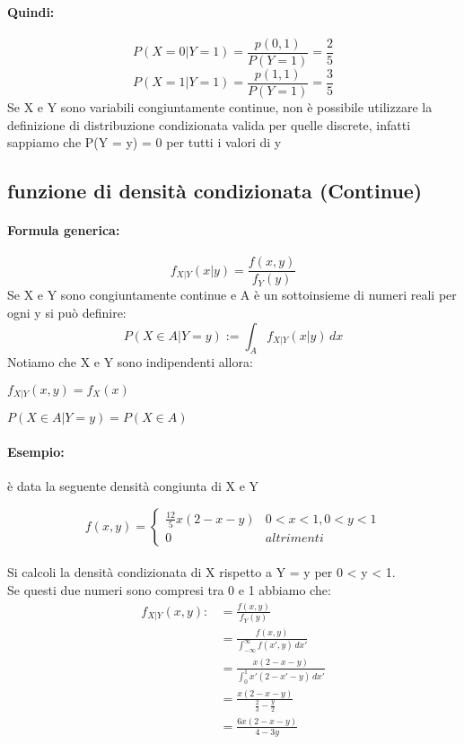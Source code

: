 \documentclass[]{article}
\newcommand{\formula}{\paragraph{Formula generica:}}
\begin{document}
    \paragraph{Quindi:}
    \[ P(X = 0 | Y = 1) = \frac{p(0,1)}{P(Y = 1)} = \frac{2}{5} \]
    \[ P(X = 1 | Y = 1) = \frac{p(1,1)}{P(Y = 1)} = \frac{3}{5} \]
    Se X e Y sono variabili congiuntamente continue, non è possibile utilizzare la
    definizione di distribuzione condizionata valida per quelle discrete, infatti sappiamo
    che P(Y = y) = 0 per tutti i valori di y


    \subsection{funzione di densità condizionata (Continue)}
    \formula
    \[ f_{X|Y}(x | y) = \frac{f(x, y)}{f_Y(y)}\]
    Se X e Y sono congiuntamente continue e A è un sottoinsieme di numeri reali per ogni y si può definire:
    \[ P(X \in A | Y = y) := \int_{A}^{} f_{X|Y}(x | y) \, dx \]
    Notiamo che X e Y sono indipendenti allora:
    \begin{center}
        \begin{minipage}{0.45 \textwidth}
            $ f_{X|Y}(x,y) = f_X(x) $
        \end{minipage}
        \begin{minipage}{0.45 \textwidth}
            $ P(X \in A | Y = y) = P(X \in A) $
        \end{minipage}
    \end{center}


    \paragraph{Esempio:} è data la seguente densità congiunta di X e Y



    \begin{equation*}
        f(x,y) =
        \begin{cases}
            \frac{12}{5} x(2-x-y) & 0 < x < 1, 0 < y < 1 \\
            0 & altrimenti
        \end{cases}
    \end{equation*} \\
    \linebreak[2]
    Si calcoli la densità condizionata di X rispetto a Y = y per 0 < y < 1. \\
    Se questi due numeri sono compresi tra 0 e 1 abbiamo che:
    \begin{equation*}
        \begin{split}
            f_{X|Y}(x,y):&= \frac{f(x,y)}{f_Y(y)} \\
            & = \frac{f(x, y)}{\int_{-\infty}^{\infty} f(x', y) \, dx'} \\
            & = \frac{x(2-x-y)}{\int_{0}^{1} x'(2-x'-y) \, dx'} \\
            & = \frac{x(2-x-y)}{\frac{2}{3} - \frac{y}{2}} \\
            & = \frac{6x(2-x-y)}{4-3y}
        \end{split}
    \end{equation*}
\end{document}
